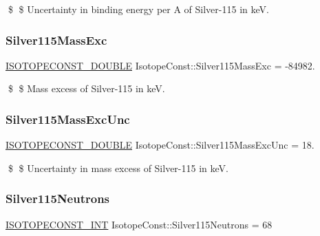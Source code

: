 \$ \$ Uncertainty in binding energy per A of Silver-\/115 in keV. \mbox{\label{group___isotope_const-_silver-_ag115_gab55c4cd34a30c96ded305a9149bb4117}} 
\subsubsection{\texorpdfstring{Silver115\+Mass\+Exc}{Silver115MassExc}}
{\footnotesize\ttfamily \mbox{\hyperlink{group___isotope_const-_macros_ga8f45a7272ce02c0b4c65c44636ed719a}{I\+S\+O\+T\+O\+P\+E\+C\+O\+N\+S\+T\+\_\+\+D\+O\+U\+B\+LE}} Isotope\+Const\+::\+Silver115\+Mass\+Exc = -\/84982.}

\$ \$ Mass excess of Silver-\/115 in keV. \mbox{\label{group___isotope_const-_silver-_ag115_gafc7c0cf6127b8121b0284573c3f4c6d9}} 
\subsubsection{\texorpdfstring{Silver115\+Mass\+Exc\+Unc}{Silver115MassExcUnc}}
{\footnotesize\ttfamily \mbox{\hyperlink{group___isotope_const-_macros_ga8f45a7272ce02c0b4c65c44636ed719a}{I\+S\+O\+T\+O\+P\+E\+C\+O\+N\+S\+T\+\_\+\+D\+O\+U\+B\+LE}} Isotope\+Const\+::\+Silver115\+Mass\+Exc\+Unc = 18.}

\$ \$ Uncertainty in mass excess of Silver-\/115 in keV. \mbox{\label{group___isotope_const-_silver-_ag115_ga5c7c51f185b3b04164eedbdfc67ea523}} 
\subsubsection{\texorpdfstring{Silver115\+Neutrons}{Silver115Neutrons}}
{\footnotesize\ttfamily \mbox{\hyperlink{group___isotope_const-_macros_ga5f18360b3e99483a35c32d789e62621c}{I\+S\+O\+T\+O\+P\+E\+C\+O\+N\+S\+T\+\_\+\+I\+NT}} Isotope\+Const\+::\+Silver115\+Neutrons = 68}

